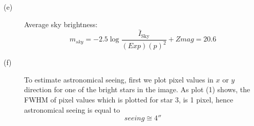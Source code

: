 \begin{description}
\item[(e)] Average sky brightness:
\[ m_{sky} = -2.5\log\frac{\bar{I}_{\mathrm{Sky}}}{(Exp)(p)^2} + Zmag = 20.6 \]

\item[(f)] To estimate astronomical seeing, first we plot pixel values in
$x$ or $y$ direction for one of the bright stars in the image. As plot (1)
shows, the FWHM of pixel values which is plotted for star 3, is 1 pixel,
hence astronomical seeing is equal to
\[ seeing \cong 4'' \]

\end{description}
